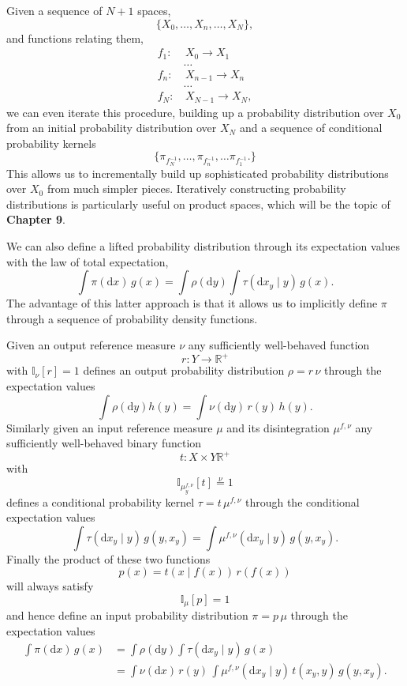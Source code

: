 \documentclass[
  letterpaper,
  DIV=11,
  numbers=noendperiod]{scrartcl}
\begin{document}
Given a sequence of \(N + 1\) spaces, \[
\{ X_{0}, \ldots, X_{n}, \ldots, X_{N} \},
\] and functions relating them, \begin{align*}
f_{1} :& \, X_{0} \rightarrow X_{1}
\\
&\ldots
\\
f_{n} :& \, X_{n - 1} \rightarrow X_{n}
\\
&\ldots
\\
f_{N} :& \, X_{N - 1} \rightarrow X_{N},
\end{align*} we can even iterate this procedure, building up a
probability distribution over \(X_{0}\) from an initial probability
distribution over \(X_{N}\) and a sequence of conditional probability
kernels \[
\{
\pi_{f^{-1}_{N} }, \ldots, \pi_{f^{-1}_{n} }, \ldots \pi_{f^{-1}_{1} }.
\}
\] This allows us to incrementally build up sophisticated probability
distributions over \(X_{0}\) from much simpler pieces. Iteratively
constructing probability distributions is particularly useful on product
spaces, which will be the topic of \textbf{Chapter 9}.

We can also define a lifted probability distribution through its
expectation values with the law of total expectation, \[
\int \pi( \mathrm{d} x ) \, g(x)
=
\int \rho (\mathrm{d} y)
\int \tau( \mathrm{d}x_{y} \mid y ) \, g(x).
\] The advantage of this latter approach is that it allows us to
implicitly define \(\pi\) through a sequence of probability density
functions.

Given an output reference measure \(\nu\) any sufficiently well-behaved
function \[
r : Y \rightarrow \mathbb{R}^{+}
\] with \(\mathbb{I}_{\nu}[ r ] = 1\) defines an output probability
distribution \(\rho = r \, \nu\) through the expectation values \[
\int \rho( \mathrm{d} y ) h(y)
=
\int \nu (\mathrm{d} y) \, r(y) \, h(y).
\] Similarly given an input reference measure \(\mu\) and its
disintegration \(\mu^{f, \nu}\) any sufficiently well-behaved binary
function \[
t : X \times Y \mathbb{R}^{+}
\] with \[
\mathbb{I}_{\mu^{f, \nu}_{y}}[ t ] \overset{\nu}{=} 1
\] defines a conditional probability kernel \(\tau = t \, \mu^{f, \nu}\)
through the conditional expectation values \[
\int \tau( \mathrm{d} x_{y} \mid y) \, g(y, x_{y})
=
\int \mu^{f, \nu}( \mathrm{d} x_{y} \mid y) \, g(y, x_{y}).
\] Finally the product of these two functions \[
p(x) = t(x \mid f(x) ) \, r( f(x) )
\] will always satisfy \[
\mathbb{I}_{\mu} [ p ] = 1
\] and hence define an input probability distribution \(\pi = p \, \mu\)
through the expectation values \begin{align*}
\int \pi( \mathrm{d}x ) \, g(x)
&=
\int \rho (\mathrm{d}y)
\int \tau( \mathrm{d}x_{y} \mid y ) \, g(x)
\\
&=
\int \nu (\mathrm{d}x ) \, r(y) \,
\int \mu^{f, \nu}( \mathrm{d}x_{y} \mid y) \,
t(x_{y}, y) \, g(y, x_{y}).
\end{align*}
\end{document}
